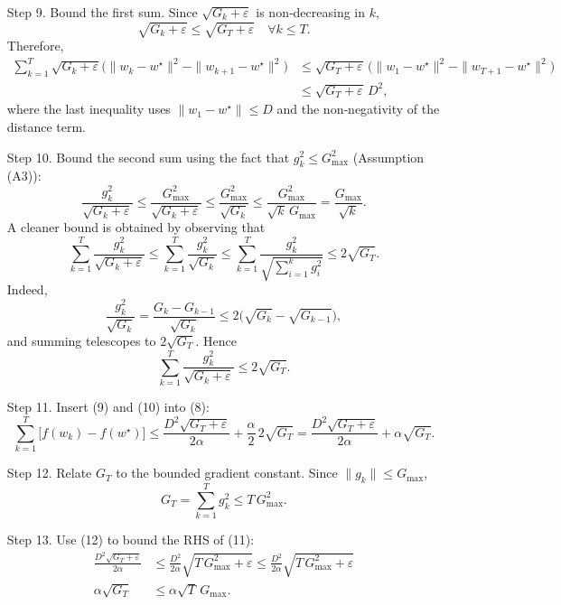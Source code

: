 \documentclass{article}
\begin{document}
\begin{enumerate}
\item[Step 9.] Bound the first sum.
Since $\sqrt{G_{k}+\varepsilon}$ is non‑decreasing in $k$,
\[
\sqrt{G_{k}+\varepsilon}\le\sqrt{G_{T}+\varepsilon}
\quad\forall k\le T .
\]
Therefore,
\[
\begin{aligned}
\sum_{k=1}^{T}
\sqrt{G_{k}+\varepsilon}
\bigl(\|w_{k}-w^{\star}\|^{2}-\|w_{k+1}-w^{\star}\|^{2}\bigr)
&\le
\sqrt{G_{T}+\varepsilon}\,
\bigl(\|w_{1}-w^{\star}\|^{2}-\|w_{T+1}-w^{\star}\|^{2}\bigr)\\
&\le
\sqrt{G_{T}+\varepsilon}\, D^{2},
\end{aligned}
\tag{9}
\]
where the last inequality uses $\|w_{1}-w^{\star}\|\le D$ and the
non‑negativity of the distance term.

\item[Step 10.] Bound the second sum using the fact that
$g_{k}^{2}\le G_{\max}^{2}$ (Assumption (A3)):
\[
\frac{g_{k}^{2}}{\sqrt{G_{k}+\varepsilon}}
\le
\frac{G_{\max}^{2}}{\sqrt{G_{k}+\varepsilon}}
\le
\frac{G_{\max}^{2}}{\sqrt{G_{k}}}
\le
\frac{G_{\max}^{2}}{\sqrt{k}\,G_{\max}}
= \frac{G_{\max}}{\sqrt{k}} .
\]
A cleaner bound is obtained by observing that
\[
\sum_{k=1}^{T}\frac{g_{k}^{2}}{\sqrt{G_{k}+\varepsilon}}
\le
\sum_{k=1}^{T}\frac{g_{k}^{2}}{\sqrt{G_{k}}}
\le
\sum_{k=1}^{T}\frac{g_{k}^{2}}{\sqrt{\sum_{i=1}^{k}g_{i}^{2}}}
\le
2\sqrt{G_{T}} .
\]
Indeed,
\[
\frac{g_{k}^{2}}{\sqrt{G_{k}}}
=
\frac{G_{k}-G_{k-1}}{\sqrt{G_{k}}}
\le
2\bigl(\sqrt{G_{k}}-\sqrt{G_{k-1}}\bigr),
\]
and summing telescopes to $2\sqrt{G_{T}}$. Hence
\[
\sum_{k=1}^{T}
\frac{g_{k}^{2}}{\sqrt{G_{k}+\varepsilon}}
\le
2\sqrt{G_{T}} . \tag{10}
\]

\item[Step 11.] Insert (9) and (10) into (8):
\[
\sum_{k=1}^{T}\bigl[f(w_{k})-f(w^{\star})\bigr]
\le
\frac{D^{2}\sqrt{G_{T}+\varepsilon}}{2\alpha}
+\frac{\alpha}{2}\, 2\sqrt{G_{T}}
=
\frac{D^{2}\sqrt{G_{T}+\varepsilon}}{2\alpha}
+\alpha\sqrt{G_{T}} . \tag{11}
\]

\item[Step 12.] Relate $G_{T}$ to the bounded gradient constant.
Since $\|g_{k}\|\le G_{\max}$,
\[
G_{T}= \sum_{k=1}^{T} g_{k}^{2}\le T\,G_{\max}^{2}. \tag{12}
\]

\item[Step 13.] Use (12) to bound the RHS of (11):
\[
\begin{aligned}
\frac{D^{2}\sqrt{G_{T}+\varepsilon}}{2\alpha}
&\le
\frac{D^{2}}{2\alpha}\sqrt{T\,G_{\max}^{2}+\varepsilon}
\le
\frac{D^{2}}{2\alpha}\sqrt{T\,G_{\max}^{2}+\varepsilon}
\\[4pt]
\alpha\sqrt{G_{T}}
&\le
\alpha\sqrt{T}\,G_{\max}.
\end{aligned}
\tag{13}
\]


\end{enumerate}
\end{document}
